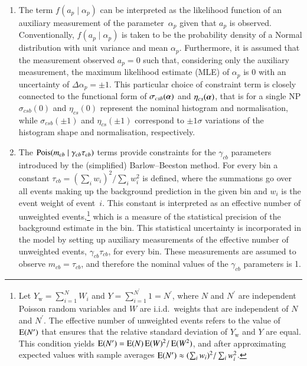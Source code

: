 \begin{enumerate}

\item The term $f(a_p \mid \alpha_p)$ can be interpreted as the likelihood
  function of an auxiliary measurement of the parameter~$\alpha_p$ given that
  $a_p$ is observed. Conventionally, $f(a_p \mid \alpha_p)$ is taken to be the
  probability density of a Normal distribution with unit variance and mean
  $\alpha_p$. Furthermore, it is assumed that the measurement observed $a_p = 0$
  such that, considering only the auxiliary measurement, the maximum likelihood
  estimate (MLE) of $\alpha_p$ is 0 with an uncertainty of
  $\Delta \alpha_p = \pm 1$. This particular choice of constraint term is
  closely connected to the functional form of $\sigma_{csb}(\myvec{\alpha})$ and
  $\eta_{cs}(\myvec{\alpha})$, that is for a single NP $\sigma_{csb}(0)$ and
  $\eta_{cs}(0)$ represent the nominal histogram and normalisation, while
  $\sigma_{csb}(\pm 1)$ and $\eta_{cs}(\pm 1)$ correspond to $\pm 1 \sigma$
  variations of the histogram shape and normalisation, respectively.


\item The $\operatorname{Pois}(m_{cb} \mid \gamma_{cb} \tau_{cb})$ terms provide constraints
  for the $\gamma_{cb}$ parameters introduced by the (simplified)
  Barlow--Beeston method. For every bin a constant
  $ \tau_{cb} = ( \sum_i w_i )^2 / \sum_i w_i^2 $ is defined, where the
  summations go over all events making up the background prediction in the given
  bin and $w_i$ is the event weight of event~$i$. This constant is interpreted
  as an effective number of unweighted events,\footnote{Let
    $Y_{\text{w}} = \sum_{i = 1}^{N} W_i$ and
    $Y = \sum_{i = 1}^{N^\prime} 1 = N^\prime$, where $N$ and $N^\prime$ are
    independent Poisson random variables and $W$ are i.i.d.\ weights that are
    independent of $N$ and $N^\prime$. The effective number of unweighted events
    refers to the value of $\operatorname{E}(N^\prime)$ that ensures that the relative
    standard deviation of $Y_{\text{w}}$ and $Y$ are equal. This condition
    yields $\operatorname{E}(N^\prime) = \operatorname{E}(N) \operatorname{E}(W)^2 / \operatorname{E}(W^2)$, and
    after approximating expected values with sample averages
    $\operatorname{E}(N^\prime) \approx ( \sum_i w_i )^2 / \sum_i w_i^2$.} which is a
  measure of the statistical precision of the background estimate in the
  bin. This statistical uncertainty is incorporated in the model by setting up
  auxiliary measurements of the effective number of unweighted events,
  $\gamma_{cb}\tau_{cb}$, for every bin. These measurements are assumed to
  observe $m_{cb} = \tau_{cb}$, and therefore the nominal values of the
  $\gamma_{cb}$ parameters is 1.
\end{enumerate}
%
%

